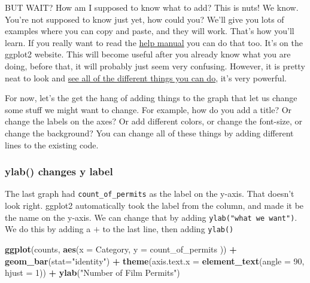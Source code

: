 \documentclass[]{book}
\newenvironment{Shaded}{\begin{snugshade}}{\end{snugshade}}
\newcommand{\KeywordTok}[1]{\textcolor[rgb]{0.13,0.29,0.53}{\textbf{#1}}}
\newcommand{\DataTypeTok}[1]{\textcolor[rgb]{0.13,0.29,0.53}{#1}}
\newcommand{\DecValTok}[1]{\textcolor[rgb]{0.00,0.00,0.81}{#1}}
\newcommand{\StringTok}[1]{\textcolor[rgb]{0.31,0.60,0.02}{#1}}
\newcommand{\OperatorTok}[1]{\textcolor[rgb]{0.81,0.36,0.00}{\textbf{#1}}}
\newcommand{\NormalTok}[1]{#1}
\begin{document}
BUT WAIT? How am I supposed to know what to add? This is nuts! We know.
You're not supposed to know just yet, how could you? We'll give you lots
of examples where you can copy and paste, and they will work. That's how
you'll learn. If you really want to read the
\href{https://ggplot2.tidyverse.org/reference/index.html}{help manual}
you can do that too. It's on the ggplot2 website. This will become
useful after you already know what you are doing, before that, it will
probably just seem very confusing. However, it is pretty neat to look
and \href{http://www.ggplot2-exts.org/gallery/}{see all of the different
things you can do}, it's very powerful.

For now, let's the get the hang of adding things to the graph that let
us change some stuff we might want to change. For example, how do you
add a title? Or change the labels on the axes? Or add different colors,
or change the font-size, or change the background? You can change all of
these things by adding different lines to the existing code.

\subsubsection{ylab() changes y label}\label{ylab-changes-y-label}

The last graph had \texttt{count\_of\_permits} as the label on the
y-axis. That doesn't look right. ggplot2 automatically took the label
from the column, and made it be the name on the y-axis. We can change
that by adding \texttt{ylab("what\ we\ want")}. We do this by adding a
\(+\) to the last line, then adding \texttt{ylab()}

\begin{Shaded}
\begin{Highlighting}[]
\KeywordTok{ggplot}\NormalTok{(counts, }\KeywordTok{aes}\NormalTok{(}\DataTypeTok{x =}\NormalTok{ Category, }\DataTypeTok{y =}\NormalTok{ count_of_permits )) }\OperatorTok{+}
\StringTok{  }\KeywordTok{geom_bar}\NormalTok{(}\DataTypeTok{stat=}\StringTok{"identity"}\NormalTok{) }\OperatorTok{+}\StringTok{ }
\StringTok{  }\KeywordTok{theme}\NormalTok{(}\DataTypeTok{axis.text.x =} \KeywordTok{element_text}\NormalTok{(}\DataTypeTok{angle =} \DecValTok{90}\NormalTok{, }\DataTypeTok{hjust =} \DecValTok{1}\NormalTok{)) }\OperatorTok{+}
\StringTok{  }\KeywordTok{ylab}\NormalTok{(}\StringTok{"Number of Film Permits"}\NormalTok{)}
\end{Highlighting}
\end{Shaded}
\end{document}
